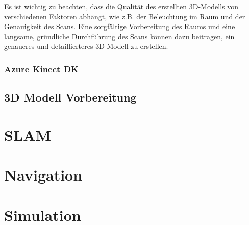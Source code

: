 
        Es ist wichtig zu beachten, dass die Qualität des erstellten 3D-Modells von verschiedenen Faktoren abhängt, wie z.B. der Beleuchtung im Raum und der Genauigkeit des Scans. Eine sorgfältige Vorbereitung des Raums und eine langsame, gründliche Durchführung des Scans können dazu beitragen, ein genaueres und detaillierteres 3D-Modell zu erstellen.
        \subsubsection{Azure Kinect \ac{DK}} \label{kinect:subsubsection}

    \subsection{3D Modell Vorbereitung} \label{3d_modell_vorbereitung:subsection}


\section{SLAM} \label{slam:section}
\section{Navigation} \label{navigation:section} 




\section{Simulation} \label{simulation:section}



